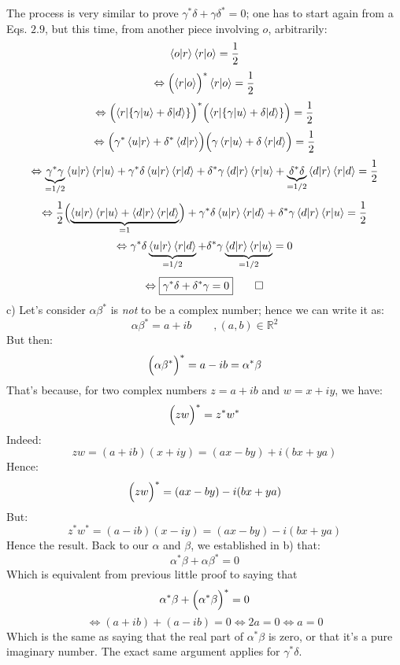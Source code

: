 \documentclass[solutions.tex]{subfiles}
\begin{document}
The process is very similar to prove $\gamma^*\delta + \gamma\delta^* = 0$;
one has to start again from a Eqs. $2.9$, but this time, from another piece
involving $o$, arbitrarily:
\[
	\left\langle o \middle| r \right\rangle\left\langle r \middle| o \right\rangle = \frac1{2}
\]
\[
	\Leftrightarrow
	\Bigl(\left\langle r \middle| o \right\rangle\Bigr)^*\left\langle r \middle| o \right\rangle = \frac12
\]
\[
	\Leftrightarrow
	\Bigl(\langle r|\{\gamma|u\rangle+\delta|d\rangle\}\Bigr)^*
	\Bigl(\langle r|\{\gamma|u\rangle+\delta|d\rangle\}\Bigr) = \frac12
\]
\[
	\Leftrightarrow
	\Bigl(\gamma^*\left\langle u \middle| r \right\rangle+\delta^*\left\langle d \middle| r \right\rangle\Bigr)
	\Bigl(\gamma\left\langle r \middle| u \right\rangle+\delta\left\langle r \middle| d \right\rangle\Bigr) = \frac12
\]
\[
	\Leftrightarrow
	\underbrace{\gamma^*\gamma}_{=1/2}\left\langle u \middle| r \right\rangle\left\langle r \middle| u \right\rangle+
	\gamma^*\delta\left\langle u \middle| r \right\rangle\left\langle r \middle| d \right\rangle+
	\delta^*\gamma\left\langle d \middle| r \right\rangle\left\langle r \middle| u \right\rangle+
	\underbrace{\delta^*\delta}_{=1/2}\left\langle d \middle| r \right\rangle\left\langle r \middle| d \right\rangle = \frac12
\]
\[
	\Leftrightarrow
	\frac12\Bigl(\underbrace{
		\left\langle u \middle| r \right\rangle\left\langle r \middle| u \right\rangle
		+\left\langle d \middle| r \right\rangle\left\langle r \middle| d \right\rangle
	}_{=1}\Bigr)+
	\gamma^*\delta\left\langle u \middle| r \right\rangle\left\langle r \middle| d \right\rangle+
	\delta^*\gamma\left\langle d \middle| r \right\rangle\left\langle r \middle| u \right\rangle = \frac12
\]
\[
	\Leftrightarrow
	\gamma^*\delta\underbrace{\left\langle u \middle| r \right\rangle\left\langle r \middle| d \right\rangle}_{=1/2}+
	\delta^*\gamma\underbrace{\left\langle d \middle| r \right\rangle\left\langle r \middle| u \right\rangle}_{=1/2} = 0
\]
\[
	\Leftrightarrow
	\boxed{\gamma^*\delta+\delta^*\gamma = 0}\qed
\]
\hrr
c) Let's consider $\alpha\beta^*$ is \textit{not} to be a complex number;
hence we can write it as:
\[
	\alpha\beta^* = a + ib\qquad, (a, b) \in\mathbb{R}^2
\]
But then:
\[
	\Bigl(\alpha\beta^*\Bigr)^* = a - ib = \alpha^*\beta
\]
That's because, for two complex numbers $z=a + ib$ and $w = x + iy$, we have:
\[
	\Bigl(zw\Bigr)^* =z^*w^*
\]
Indeed:
\[
	zw = (a + ib)(x + iy) = (ax - by) + i(bx + ya)
\]
Hence:
\[
	\Bigl(zw\Bigr)^* =  (ax - by) - i(bx + ya)
\]
But:
\[
	z^*w^* = (a - ib)(x - iy) = (ax - by) - i(bx + ya)
\]
Hence the result. Back to our $\alpha$ and $\beta$, we established
in b) that:
\[
	\alpha^*\beta + \alpha\beta^* = 0
\]
Which is equivalent from previous little proof to saying
that
\[
	\alpha^*\beta + \Bigl(\alpha^*\beta\Bigr)^* = 0
\]
\[
	\Leftrightarrow
	(a+ib) + (a-ib) = 0 \Leftrightarrow 2a = 0
	\Leftrightarrow \boxed{a = 0}
\]
Which is the same as saying that the real part of $\alpha^*\beta$ is zero,
or that it's a pure imaginary number. The exact same argument applies
for $\gamma^*\delta$.
\end{document}
